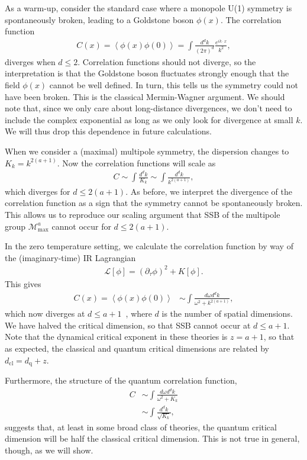 \documentclass[prb,aps,twocolumn, amsfonts,amsmath,amssymb,nofootinbib,superscriptaddress]{revtex4-2}
\newcommand{\nn}{\nonumber\\}
\renewcommand{\max}{\text{max}}
\begin{document}
As a warm-up, consider the standard case where a monopole U(1) symmetry is spontaneously broken, leading to a Goldstone boson $\phi(x)$. The correlation function
\begin{align}
C(x) = \left\langle \phi(x) \phi(0) \right\rangle = \int \frac{d^dk}{(2\pi)^d} \frac{e^{i k \cdot x}}{k^2}, 
\end{align}
diverges when $d\le 2$. Correlation functions should not diverge, so the interpretation is that the Goldstone boson fluctuates strongly enough that the field $\phi(x)$ cannot be well defined. In turn, this tells us the symmetry could not have been broken. This is the classical Mermin-Wagner argument. We should note that, since we only care about long-distance divergences, we don't need to include the complex exponential as long as we only look for divergence at small $k$. We will thus drop this dependence in future calculations. 

When we consider a (maximal) multipole symmetry, the dispersion changes to $K_k=k^{2(a+1)}$. Now the correlation functions will scale as 
\begin{align}
C \sim \int \frac{d^dk}{K_k} \sim \int \frac{d^dk}{k^{2(a+1)}}, \label{eqn:correl}
\end{align}
which diverges for $d\le2(a+1)$. As before, we interpret the divergence of the correlation function as a sign that the symmetry cannot be spontaneously broken. This allows us to reproduce our scaling argument that SSB of the multipole group $\mathcal{M}^a_\max$ cannot occur for $d\le2(a+1)$.

In the zero temperature setting, we calculate the correlation function by way of the (imaginary-time) IR Lagrangian 
\begin{align}
     \mathcal{L}[\phi] = (\partial_\tau\phi)^2 + K[\phi].
\end{align} 
This gives 
\begin{align}
\label{tzerocorr}C(x) = \left\langle \phi(x) \phi(0) \right\rangle &\sim \int \frac{d\omega d^dk}{\omega^2 + k^{2( a + 1 )}},
\end{align}
which now diverges at $d\le a+1$~\cite{Griffin2015}, where $d$ is the number of spatial dimensions. We have halved the critical dimension, so that SSB cannot occur at $d\le a+1$. Note that the dynamical critical exponent in these theories is $z = a+1$, so that as expected, the classical and quantum critical dimensions are related by $d_\text{cl} = d_\text{q} + z$.

Furthermore, the structure of the quantum correlation function,
\begin{align}
C &\sim \int \frac{d\omega d^dk}{\omega^2 + K_k}\nn
&\sim \int \frac{d^dk}{\sqrt{K_k}},
\end{align}
suggests that, at least in some broad class of theories, the quantum critical dimension will be half the classical critical dimension. This is not true in general, though, as we will show.
\end{document}
